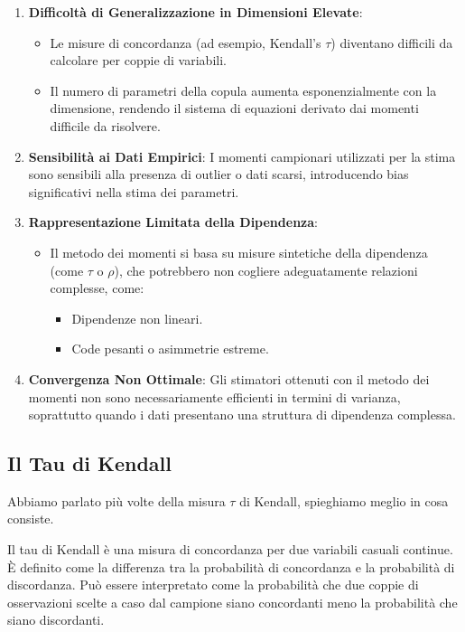 \documentclass[%
	corpo=11pt,
    twoside,
    stile=classica,
    oldstyle,
    tipotesi=custom,
    greek,
    evenboxes,
]{toptesi}
\begin{document}
\begin{enumerate}
	\item \textbf{Difficoltà di Generalizzazione in Dimensioni Elevate}: 
	\begin{itemize}
		\item Le misure di concordanza (ad esempio, Kendall’s \( \tau \)) diventano difficili da calcolare per coppie di variabili.
		\item Il numero di parametri della copula aumenta esponenzialmente con la dimensione, rendendo il sistema di equazioni derivato dai momenti difficile da risolvere.
	\end{itemize}
	
	\item \textbf{Sensibilità ai Dati Empirici}: I momenti campionari utilizzati per la stima sono sensibili alla presenza di outlier o dati scarsi, introducendo bias significativi nella stima dei parametri.
	
	\item \textbf{Rappresentazione Limitata della Dipendenza}:
	\begin{itemize}
		\item Il metodo dei momenti si basa su misure sintetiche della dipendenza (come \( \tau \) o \( \rho \)), che potrebbero non cogliere adeguatamente relazioni complesse, come:
		\begin{itemize}
			\item Dipendenze non lineari.
			\item Code pesanti o asimmetrie estreme.
		\end{itemize}
	\end{itemize}
	
	\item \textbf{Convergenza Non Ottimale}: Gli stimatori ottenuti con il metodo dei momenti non sono necessariamente efficienti in termini di varianza, soprattutto quando i dati presentano una struttura di dipendenza complessa.
\end{enumerate}

\newpage

\subsection{Il Tau di Kendall}

Abbiamo parlato più volte della misura \( \tau \) di Kendall, spieghiamo meglio in cosa consiste.

Il tau di Kendall è una misura di concordanza per due variabili casuali continue. È definito come la differenza tra la probabilità di concordanza e la probabilità di discordanza. Può essere interpretato come la probabilità che due coppie di osservazioni scelte a caso dal campione siano concordanti meno la probabilità che siano discordanti.
\end{document}
